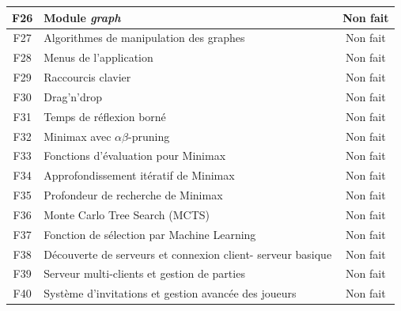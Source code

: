 \documentclass[11pt]{article}
\begin{document}
\begin{longtable}{|c|l|c|}
F26 & Module \textit{graph} & Non fait \\ \hline
F27 & Algorithmes de manipulation des graphes & Non fait \\ \hline

F28 & Menus de l’application & Non fait \\ \hline
F29 & Raccourcis clavier & Non fait \\ \hline
F30 & Drag'n'drop & Non fait \\ \hline

F31 & Temps de réflexion borné & Non fait \\ \hline
F32 & Minimax avec $\alpha$$\beta$-pruning & Non fait \\ \hline
F33 & Fonctions d’évaluation pour Minimax & Non fait \\ \hline
F34 & Approfondissement itératif de Minimax & Non fait \\ \hline
F35 & Profondeur de recherche de Minimax & Non fait \\ \hline
F36 & Monte Carlo Tree Search (MCTS) & Non fait \\ \hline
F37 & Fonction de sélection par Machine Learning & Non fait \\ \hline

F38 & Découverte de serveurs et connexion client-
serveur basique & Non fait \\ \hline
F39 & Serveur multi-clients et gestion de parties & Non fait \\ \hline
F40 & Système d’invitations et gestion avancée des
joueurs & Non fait \\ \hline

\end{longtable}



\nocite{*}


\end{document}

